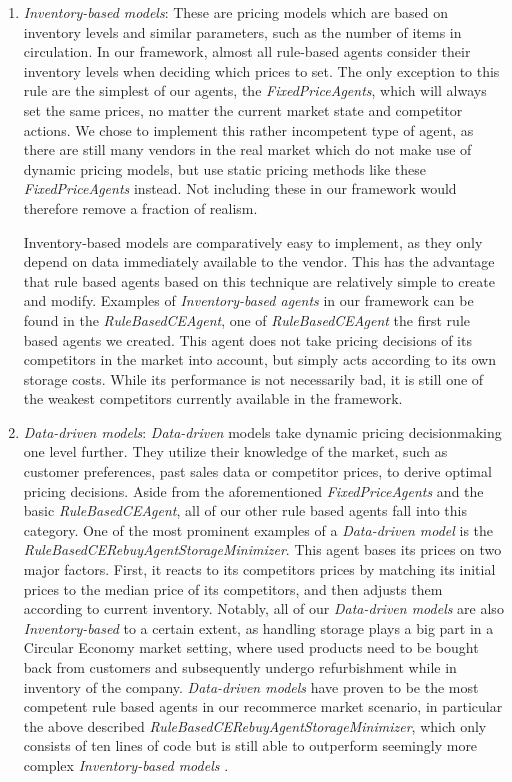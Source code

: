 \begin{enumerate}
	\item \emph{Inventory-based models}: These are pricing models which are based on inventory levels and similar parameters, such as the number of items in circulation. In our framework, almost all rule-based agents consider their inventory levels when deciding which prices to set. The only exception to this rule are the simplest of our agents, the \emph{FixedPriceAgents}, which will always set the same prices, no matter the current market state and competitor actions. We chose to implement this rather incompetent type of agent, as there are still many vendors in the real market which do not make use of dynamic pricing models, but use static pricing methods like these \emph{FixedPriceAgents} instead. Not including these in our framework would therefore remove a fraction of realism.

	Inventory-based models are comparatively easy to implement, as they only depend on data immediately available to the vendor. This has the advantage that rule based agents based on this technique are relatively simple to create and modify. Examples of \emph{Inventory-based agents} in our framework can be found in the \emph{RuleBasedCEAgent}, one of \emph{RuleBasedCEAgent} the first rule based agents we created. This agent does not take pricing decisions of its competitors in the market into account, but simply acts according to its own storage costs. While its performance is not necessarily bad, it is still one of the weakest competitors currently available in the framework. 

	\item \emph{Data-driven models}: \emph{Data-driven} models take dynamic pricing decisionmaking one level further. They utilize their knowledge of the market, such as customer preferences, past sales data or competitor prices, to derive optimal pricing decisions. Aside from the aforementioned \emph{FixedPriceAgents} and the basic \emph{RuleBasedCEAgent}, all of our other rule based agents fall into this category. One of the most prominent examples of a \emph{Data-driven model} is the \emph{RuleBasedCERebuyAgentStorageMinimizer}. This agent bases its prices on two major factors. First, it reacts to its competitors prices by matching its initial prices to the median price of its competitors, and then adjusts them according to current inventory. Notably, all of our \emph{Data-driven models} are also \emph{Inventory-based} to a certain extent, as handling storage plays a big part in a Circular Economy market setting, where used products need to be bought back from customers and subsequently undergo refurbishment while in inventory of the company. \emph{Data-driven models} have proven to be the most competent rule based agents in our recommerce market scenario, in particular the above described \emph{RuleBasedCERebuyAgentStorageMinimizer}, which only consists of ten lines of code but is still able to outperform seemingly more complex \emph{Inventory-based models} .


\end{enumerate}
